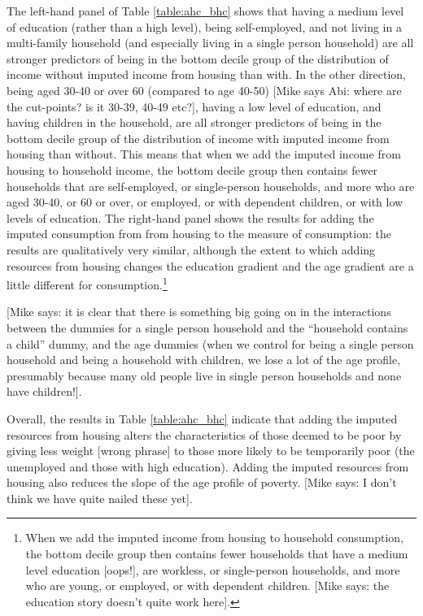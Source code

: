 The left-hand panel of Table \ref{table:ahc_bhc} shows that having a medium level of education (rather than a high level), being self-employed, and not living in a multi-family household (and especially living in a single person household) are all stronger predictors of being in the bottom decile group of the distribution of income without imputed income from housing than with. In the other direction, being aged 30-40 or over 60 (compared to age 40-50) [Mike says Abi: where are the cut-points? is it 30-39, 40-49 etc?], having a low level of education, and having children in the household, are all stronger predictors of being in the bottom decile group of the distribution of income with imputed income from housing than without. This means that when we add the imputed income from housing to household income, the bottom decile group then contains fewer households that are self-employed, or single-person households, and more who are aged 30-40, or 60 or over, or employed, or with dependent children, or with low levels of education.  The right-hand panel shows the results for adding the imputed consumption from from housing to the measure of consumption: the results are qualitatively very similar, although the extent to which adding resources from housing changes the education gradient and the age gradient are a little different for consumption.\footnote{When we add the imputed income from housing to household consumption, the bottom decile group then contains fewer households that have a medium level education [oops!], are workless, or single-person households, and more who are young, or employed, or with dependent children. [Mike says: the education story doesn't quite work here].} 

[Mike says: it is clear that there is something big going on in the interactions between the dummies for a single person household and the ``household contains a child'' dummy, and the age dummies (when we control for being a single person household and being a household with children, we lose a lot of the age profile, presumably because many old people live in single person households and none have children!].

Overall, the results in Table \ref{table:ahc_bhc} indicate that adding the imputed resources from housing alters the characteristics of those deemed to be poor by giving less weight [wrong phrase] to those more likely to be temporarily poor (the unemployed and those with high education). Adding the imputed resources from housing also reduces the slope of the age profile of poverty. [Mike says: I don't think we have quite nailed these yet].

